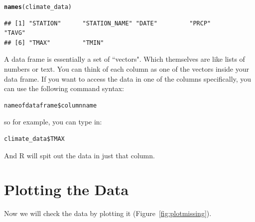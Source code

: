 \documentclass{article}\usepackage[]{graphicx}\usepackage[]{color}
\makeatletter
\newcommand{\hlstd}[1]{\textcolor[rgb]{0.345,0.345,0.345}{#1}}%
\newcommand{\hlkwd}[1]{\textcolor[rgb]{0.737,0.353,0.396}{\textbf{#1}}}%
\newenvironment{kframe}{%
 \def\at@end@of@kframe{}%
 \ifinner\ifhmode%
  \def\at@end@of@kframe{\end{minipage}}%
  \begin{minipage}{\columnwidth}%
 \fi\fi%
 \def\FrameCommand##1{\hskip\@totalleftmargin \hskip-\fboxsep
 \colorbox{shadecolor}{##1}\hskip-\fboxsep
     \hskip-\linewidth \hskip-\@totalleftmargin \hskip\columnwidth}%
 \MakeFramed {\advance\hsize-\width
   \@totalleftmargin\z@ \linewidth\hsize
   \@setminipage}}%
 {\par\unskip\endMakeFramed%
 \at@end@of@kframe}
\newenvironment{knitrout}{}{} %
\makeatother
\begin{document}
\begin{knitrout}
\color{fgcolor}\begin{kframe}
\begin{alltt}
\hlkwd{names}\hlstd{(climate_data)}
\end{alltt}
\begin{verbatim}
## [1] "STATION"      "STATION_NAME" "DATE"         "PRCP"         "TAVG"        
## [6] "TMAX"         "TMIN"
\end{verbatim}
\end{kframe}
\end{knitrout}

A data frame is essentially a set of ``vectors". Which themselves are like lists of numbers or text. You can think of each column as one of the vectors inside your data frame. If you want to access the data in one of the columns specifically, you can use the following command syntax:

\begin{verbatim}
nameofdataframe$columnname
\end{verbatim}

so for example, you can type in:

\begin{verbatim}
climate_data$TMAX
\end{verbatim}

And R will spit out the data in just that column. 

\section{Plotting the Data}

Now we will check the data by plotting it (Figure~\ref{fig:plotmissing}). 
\end{document}
